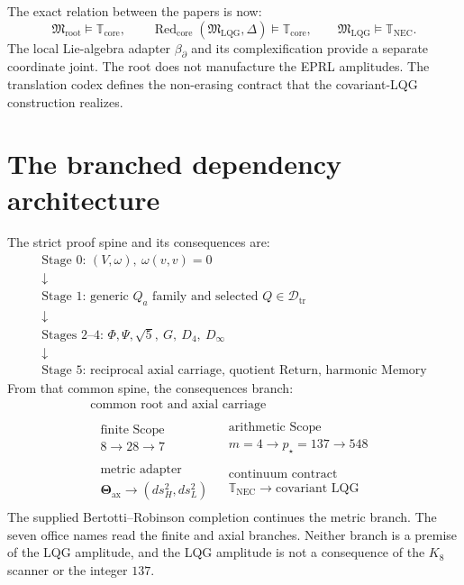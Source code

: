 \documentclass[11pt]{article}
\newcommand{\NEC}{\mathbb T_{\mathrm{NEC}}}
\newcommand{\NECore}{\mathbb T_{\mathrm{core}}}
\newcommand{\Dtr}{\mathcal D_{\mathrm{tr}}}
\begin{document}
The exact relation between the papers is now:
\[
\boxed{
\mathfrak M_{\mathrm{root}}\models\NECore,
\qquad
\operatorname{Red}_{\mathrm{core}}(\mathfrak M_{\mathrm{LQG}},\Delta)\models\NECore,
\qquad
\mathfrak M_{\mathrm{LQG}}\models\NEC.
}
\]
The local Lie-algebra adapter $\beta_\partial$ and its complexification provide a separate coordinate joint. The root does not manufacture the EPRL amplitudes. The translation codex defines the non-erasing contract that the covariant-LQG construction realizes.

\section{The branched dependency architecture}

The strict proof spine and its consequences are:
\[
\boxed{
\begin{array}{c}
\text{Stage 0: }(V,\omega),\ \omega(v,v)=0\\
\downarrow\\
\text{Stage 1: generic }Q_a\text{ family and selected }Q\in\Dtr\\
\downarrow\\
\text{Stages 2--4: }\Phi,\Psi,\sqrt5,\ G,\ D_4,\ D_\infty\\
\downarrow\\
\text{Stage 5: reciprocal axial carriage, quotient Return, harmonic Memory}
\end{array}}
\]
From that common spine, the consequences branch:
\[
\boxed{
\begin{array}{c}
\text{common root and axial carriage}\\[2mm]
\begin{array}{cc}
\begin{array}{c}
\text{finite Scope}\\
8\to28\to7
\end{array}
&
\begin{array}{c}
\text{arithmetic Scope}\\
m=4\to p_\star=137\to548
\end{array}
\\[4mm]
\begin{array}{c}
\text{metric adapter}\\
\boldsymbol\Theta_{\mathrm{ax}}\to(ds_H^2,ds_L^2)
\end{array}
&
\begin{array}{c}
\text{continuum contract}\\
\NEC\to\text{covariant LQG}
\end{array}
\end{array}
\end{array}}
\]
The supplied Bertotti--Robinson completion continues the metric branch. The seven office names read the finite and axial branches. Neither branch is a premise of the LQG amplitude, and the LQG amplitude is not a consequence of the $K_8$ scanner or the integer $137$.
\end{document}
